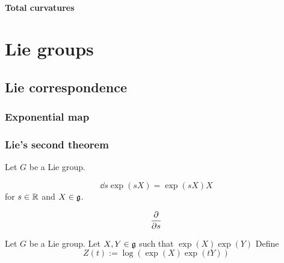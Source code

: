 \documentclass{../../large}
\begin{document}
\subsection*{Total curvatures}
\begin{prb}
\end{prb}
\begin{prb}
\end{prb}
\begin{prb}
\end{prb}









\part{Lie groups}
\chapter{Lie correspondence}
\section{Exponential map}
\begin{prb}
\end{prb}
\begin{prb}
\end{prb}

\begin{prb}
\end{prb}


\section{Lie's second theorem}
\begin{prb}
Let $G$ be a Lie group.
\begin{parts}
\item
\[\dd{s}\exp(sX)=\exp(sX)X\]
for $s\in\mathbb{R}$ and $X\in\mathfrak{g}$.
\item
\[\pd{s}\]
\end{parts}
\end{prb}

\begin{prb}
Let $G$ be a Lie group.
Let $X,Y\in\mathfrak{g}$ such that $\exp(X)\exp(Y)$
Define
\[Z(t):=\log(\exp(X)\exp(tY))\]
\end{prb}
\end{document}
